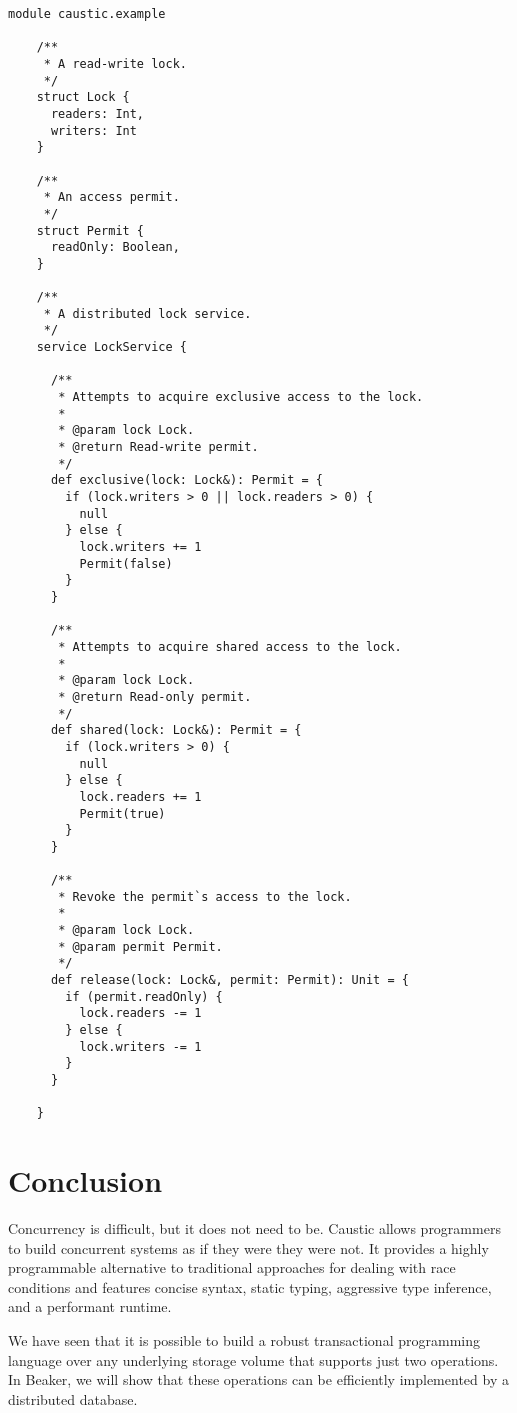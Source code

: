 \documentclass[../main.tex]{subfiles}
\begin{document}
  \begin{lstlisting}[style=Caustic]
    module caustic.example

    /**
     * A read-write lock.
     */
    struct Lock {
      readers: Int,
      writers: Int
    }

    /**
     * An access permit.
     */
    struct Permit {
      readOnly: Boolean,
    }

    /**
     * A distributed lock service.
     */
    service LockService {

      /**
       * Attempts to acquire exclusive access to the lock.
       *
       * @param lock Lock.
       * @return Read-write permit.
       */
      def exclusive(lock: Lock&): Permit = {
        if (lock.writers > 0 || lock.readers > 0) {
          null
        } else {
          lock.writers += 1
          Permit(false)
        }
      }

      /**
       * Attempts to acquire shared access to the lock.
       *
       * @param lock Lock.
       * @return Read-only permit.
       */
      def shared(lock: Lock&): Permit = {
        if (lock.writers > 0) {
          null
        } else {
          lock.readers += 1
          Permit(true)
        }
      }

      /**
       * Revoke the permit`s access to the lock.
       *
       * @param lock Lock.
       * @param permit Permit.
       */
      def release(lock: Lock&, permit: Permit): Unit = {
        if (permit.readOnly) {
          lock.readers -= 1
        } else {
          lock.writers -= 1
        }
      }

    }
  \end{lstlisting}

\section{Conclusion}
Concurrency is difficult, but it does not need to be. Caustic allows programmers to build concurrent
systems as if they were they were not. It provides a highly programmable alternative to traditional
approaches for dealing with race conditions and features concise syntax, static typing, aggressive
type inference, and a performant runtime.

We have seen that it is possible to build a robust transactional programming language over any
underlying storage volume that supports just two operations. In Beaker, we will show that these
operations can be efficiently implemented by a distributed database.
\end{document}
